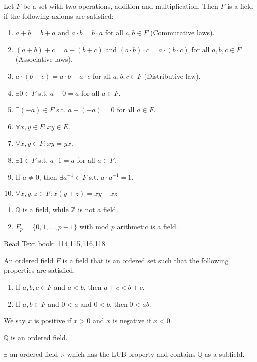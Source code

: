 \begin{definition}[Fields]
	Let $F$ be a set with two operations, addition and multiplication. Then $F$ is a field if the following axioms are satisfied:
	\begin{enumerate}
		\item $a+b=b+a$ and $a \cdot b = b \cdot a$ for all $a, b \in F$ (Commutative laws).
		\item $(a+b)+c = a+(b+c)$ and $(a \cdot b) \cdot c = a \cdot (b \cdot c)$ for all $a, b, c \in F$ (Associative laws).
		\item $a \cdot (b+c) = a \cdot b + a \cdot c$ for all $a, b, c \in F$ (Distributive law).
		\item $\exists 0 \in F$ s.t. $a+0=a$ for all $a \in F$.
		\item $\exists (-a) \in F$ s.t. $a+(-a)=0$ for all $a \in F$.
		\item $\forall x,y \in F: xy \in E$.
		\item $\forall x,y \in F: xy=yx$.
		\item $\exists 1 \in F$ s.t. $a \cdot 1 = a$ for all $a \in F$.
		\item If $a \neq 0$, then $\exists a^{-1} \in F$ s.t. $a \cdot a^{-1} = 1$.
		\item $\forall x,y,z \in F: x(y+z)=xy+xz$
	\end{enumerate}
	\begin{example}\hfill
		\begin{enumerate}
			\item	$\mathbb{Q}$ is a field, while $\mathbb{Z}$ is not a field.
			\item $F_{p}=\{0,1,\ldots, p-1\}$ with mod $p$ arithmetic is a field.
		\end{enumerate}
		Read Text book: 114,115,116,118
	\end{example}
\end{definition}
\begin{definition}
	An ordered field $F$ is a field that is an ordered set  such that the following properties are satisfied:
	\begin{enumerate}
		\item If $a,b,c \in F$ and $a<b$, then $a+c<b+c$.
		\item If $a,b \in F$ and $0<a$ and $0<b$, then $0<ab$.
	\end{enumerate}
	\begin{remark}
		We say $x$ is positive if $x>0$ and $x$ is negative if $x<0$.
	\end{remark}

	\begin{example}
		$\mathbb{Q}$ is an ordered field.
	\end{example}
\end{definition}
\begin{theorem}
	$\exists$ an ordered field $\mathbb{R}$ which has the LUB property and contains $\mathbb{Q}$ as a subfield.
\end{theorem}


